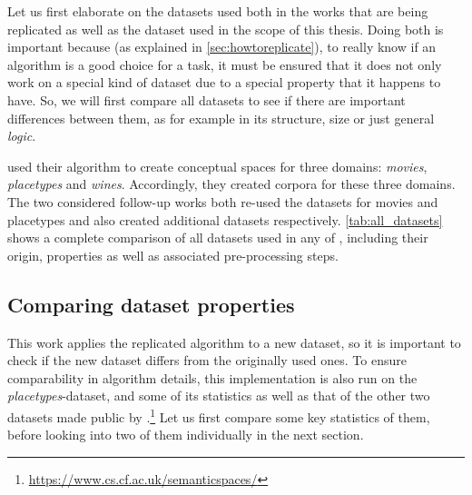 \label{sec:datasets}



Let us first elaborate on the datasets used both in the works that are being replicated as well as the dataset used in the scope of this thesis. Doing both is important because (as explained in \autoref{sec:howtoreplicate}), to really know if an algorithm is a good choice for a task, it must be ensured that it does not only work on a special kind of dataset due to a special property that it happens to have. So, we will first compare all datasets to see if there are important differences between them, as for example in its structure, size or just general \emph{logic}.

\textcite{Derrac2015} used their algorithm to create conceptual spaces for three domains: \textit{movies}, \textit{placetypes} and \textit{wines}. Accordingly, they created corpora for these three domains. The two considered follow-up works both re-used the datasets for movies and placetypes and also created additional datasets respectively. \autoref{tab:all_datasets} shows a complete comparison of all datasets used in any of \mainalgos, including their origin, properties as well as associated pre-processing steps.


\subsection*{Comparing dataset properties}

This work applies the replicated algorithm to a new dataset, so it is important to check if the new dataset differs from the originally used ones. To ensure comparability in algorithm details, this implementation is also run on the \emph{placetypes}-dataset, and some of its statistics as well as that of the other two datasets made public by \cite{Derrac2015}.\footnote{\url{https://www.cs.cf.ac.uk/semanticspaces/}} Let us first compare some key statistics of them, before looking into two of them individually in the next section.

